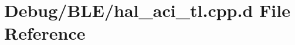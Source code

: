 \hypertarget{_debug_2_b_l_e_2hal__aci__tl_8cpp_8d}{\section{\-Debug/\-B\-L\-E/hal\-\_\-aci\-\_\-tl.cpp.\-d \-File \-Reference}
\label{_debug_2_b_l_e_2hal__aci__tl_8cpp_8d}
}
